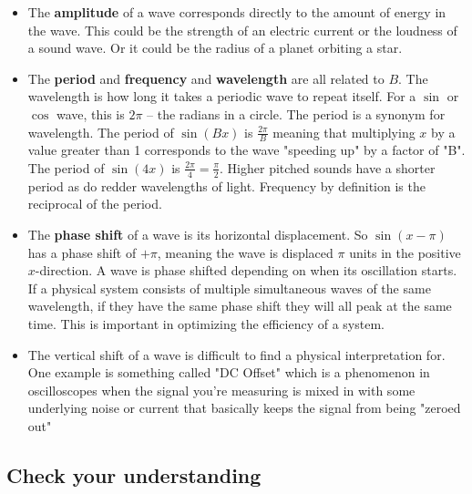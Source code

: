 \documentclass{article}
\begin{document}
\begin{multicols}{2}
\begin{itemize}
	\item The \textbf{amplitude} of a wave corresponds directly to the amount of energy in the wave. This could be the strength of an electric current or the loudness of a sound wave. Or it could be the radius of a planet orbiting a star.
	\item The \textbf{period} and \textbf{frequency} and \textbf{wavelength} are all related to $B$. The wavelength is how long it takes a periodic wave to repeat itself. For a $\sin$ or $\cos$ wave, this is $2\pi$ -- the radians in a circle. The period is a synonym for wavelength. The period of $\sin(Bx)$ is $\frac{2\pi}{B}$ meaning that multiplying $x$ by a value greater than 1 corresponds to the wave "speeding up" by a factor of "B". The period of $\sin(4x)$ is $\frac{2\pi}{4} = \frac{\pi}{2}$. Higher pitched sounds have a shorter period as do redder wavelengths of light. Frequency by definition is the reciprocal of the period.
	\item The \textbf{phase shift} of a wave is its horizontal displacement. So $\sin(x-\pi)$ has a phase shift of $+\pi$, meaning the wave is displaced $\pi$ units in the positive $x$-direction. A wave is phase shifted depending on when its oscillation starts. If a physical system consists of multiple simultaneous waves of the same wavelength, if they have the same phase shift they will all peak at the same time. This is important in optimizing the efficiency of a system.
	\item The vertical shift of a wave is difficult to find a physical interpretation for. One example is something called "DC Offset" which is a phenomenon in oscilloscopes when the signal you're measuring is mixed in with some underlying noise or current that basically keeps the signal from being "zeroed out"
\end{itemize}

\subsection*{Check your understanding}


\end{multicols}
\end{document}
